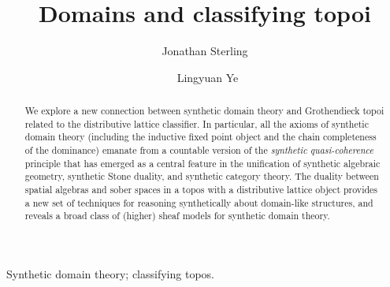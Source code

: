\documentclass{msc}
\theoremstyle{theormstyle}
\theoremstyle{remarkstyle}
\begin{document}


\title{Domains and classifying topoi}

\begin{authgrp}
\author{Jonathan Sterling}
\author{\ Lingyuan Ye} %
\end{authgrp}


\begin{abstract}
  We explore a new connection between synthetic domain theory and Grothendieck topoi related to the distributive lattice classifier. In particular, all the axioms of synthetic domain theory (including the inductive fixed point object and the chain completeness of the dominance) emanate from a countable version of the \emph{synthetic quasi-coherence} principle that has emerged as a central feature in the unification of synthetic algebraic geometry, synthetic Stone duality, and synthetic category theory. The duality between spatial algebras and sober spaces in a topos with a distributive lattice object provides a new set of techniques for reasoning synthetically about domain-like structures, and reveals a broad class of (higher) sheaf models for synthetic domain theory.
\end{abstract}

\begin{keywords}
  Synthetic domain theory; classifying topos.
\end{keywords}

\maketitle


\end{document}
